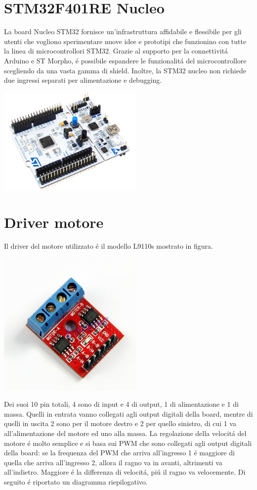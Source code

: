 \documentclass [11pt ,a4paper]{report}
\begin{document}
\section{STM32F401RE Nucleo}
La board Nucleo STM32 fornisce un'infrastruttura affidabile e flessibile per gli utenti che vogliono sperimentare nuove idee e prototipi che funzionino con tutte la linea di microcontrollori STM32. Grazie al supporto per la connettivit\'a Arduino e ST Morpho, \'e possibile espandere le funzionalit\'a del microcontrollore scegliendo da una vasta gamma di shield. Inoltre, la STM32 nucleo non richiede due ingressi separati per alimentazione e debugging.
\begin{center}
\includegraphics[keepaspectratio, width=200pt]{Images/STM32.png}
\end{center}
\section{Driver motore}
Il driver del motore utilizzato \'e il modello L9110s mostrato in figura. 
\begin{center}
\includegraphics[keepaspectratio, width=200pt]{Images/motor_driver.png}
\end{center}
Dei suoi 10 pin totali, 4 sono di input e 4 di output, 1 di alimentazione e 1 di massa. Quelli in entrata vanno collegati agli output digitali della board, mentre di quelli in uscita 2 sono per il motore destro e 2 per quello sinistro, di cui 1 va all'alimentazione del motore ed uno alla massa. La regolazione della velocit\'a del motore \'e molto semplice e si basa sui PWM che sono collegati agli output digitali della board: se la frequenza del PWM  che arriva all'ingresso 1 \'e maggiore di quella che arriva all'ingresso 2, allora il ragno va in avanti, altrimenti va all'indietro. Maggiore \'e la differenza di velocit\'a, pi\'u il ragno va velocemente. Di seguito \'e riportato un diagramma riepilogativo.
\end{document}
